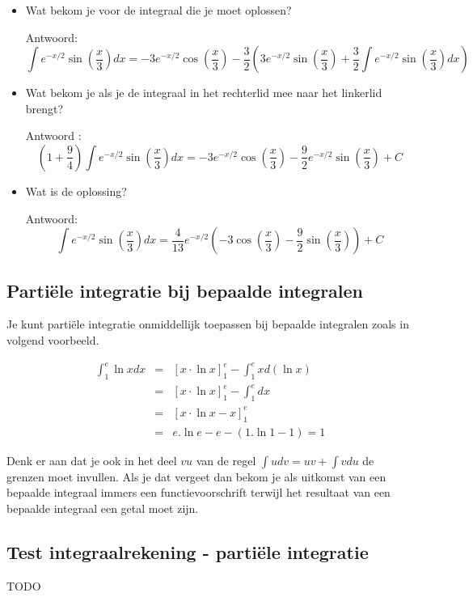 \begin{enumerate}
\begin{itemize}
		\item Wat bekom je voor de integraal die je moet oplossen?
		
		Antwoord: \begin{equation*}
		\int e^{-x/2}\sin \left( \frac{x}{3}  \right)dx=-3e^{-x/2} \cos \left( \frac{x}{3}  \right)-\frac{3}{2} \left(  3e^{-x/2}\sin \left( \frac{x}{3}  \right)+\frac{3}{2}\int e^{-x/2}\sin \left( \frac{x}{3}  \right)dx \right)
		\end{equation*}
		
		\item Wat bekom je als je de integraal in het rechterlid mee naar het linkerlid brengt?
		
		Antwoord : \begin{equation*}
		\left(  1+\frac{9}{4} \right)\int e^{-x/2}\sin \left( \frac{x}{3}  \right)dx=-3e^{-x/2} \cos \left( \frac{x}{3}  \right)-\frac{9}{2} e^{-x/2}\sin \left( \frac{x}{3}  \right)+C
		\end{equation*}
		
		\item Wat is de oplossing?
		
		Antwoord: 
		\begin{equation*}
		\int e^{-x/2}\sin \left( \frac{x}{3}  \right)dx=\frac{4}{13}e^{-x/2} \left( -3 \cos \left( 	\frac{x}{3}  \right)-\frac{9}{2}\sin \left( \frac{x}{3}  \right) \right)+C
		\end{equation*}
		
	\end{itemize}
	
\end{enumerate}


\subsection{Parti\"ele integratie bij bepaalde integralen}

Je kunt parti\"ele integratie onmiddellijk toepassen bij bepaalde integralen zoals in volgend voorbeeld.

\begin{eqnarray*}
\int ^e_1 \ln x dx &=& \left[ x \cdot \ln x \right] ^e_1- \int ^e_1 x d(\ln x) \\
&=& \left[ x \cdot \ln x \right] ^e_1-\int ^e_1dx \\
&=& \left[ x \cdot \ln x -x \right] ^e_1 \\
&=&
e.\ln e - e - (1.\ln 1 -1)=1
\end{eqnarray*}

Denk er aan dat je ook in het deel $vu$ van de regel $\int udv=uv+\int vdu$ de grenzen moet invullen. Als je dat vergeet dan bekom je als uitkomst van een bepaalde integraal immers een functievoorschrift terwijl het resultaat van een bepaalde integraal een getal moet zijn.


\subsection{Test integraalrekening - parti\"ele integratie}
TODO
